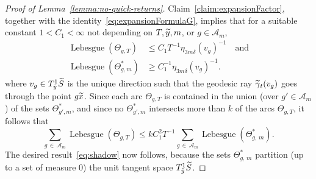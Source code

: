 \documentclass[10pt]{amsart}
\theoremstyle{definition}\newtheorem{defi}[theo]{Definition}\newtheorem{rema}[theo]{Remark}\newtheorem{exam}[theo]{Example}\newtheorem{exem}[theo]{Example}\newtheorem{nota}[theo]{Notation}
\DeclareMathOperator{\Lebesgue}{Lebesgue}
\let\oldtilde\tilde
\renewcommand*{\tilde}[1]{\mathchoice{\widetilde{#1}}{\widetilde{#1}}{\oldtilde{#1}}{\oldtilde{#1}}}\let\oldforall\forall
\renewcommand*{\forall}{\mathrel{\oldforall}}
\begin{document}
\begin{proof}[Proof of Lemma~\ref{lemma:no-quick-returns}]
Claim~\ref{claim:expansionFactor}, together with the identity~\eqref{eq:expansionFormulaG}, implies that for a suitable constant $1<C_{1}<\infty$ not depending on $T,\tilde{y},m$, or $g\in \mathcal{A}_{m}$,
\begin{align*}
\Lebesgue (\Theta_{g,T})&\leq C_{1} T^{-1}\eta_{3m \delta}(v_{g})^{-1} \quad\text{and}\\
\Lebesgue (\Theta^{*}_{g,m})&\geq C_{1}^{-1}\eta_{3m\delta}(v_{g})^{-1}.
\end{align*}
where $v_{g}\in T^{1}_{\tilde{y}}\tilde{S}$ is the unique direction such that the geodesic ray $\tilde{\gamma}_{t}(v_{g})$ goes through the point $g\tilde{x}$. Since each arc $\Theta_{g,T}$ is contained in the union (over $g' \in \mathcal{A}_{m}$) of the sets $\Theta^{*}_{g',m}$, and since no $\Theta^{*}_{g',m}$ intersects more than $k$ of the arcs $\Theta_{g,T}$, it follows that
\[
\sum_{g\,\in\,\mathcal{A}_{m}}\Lebesgue (\Theta_{g,T})\leq kC_{1}^{2} T^{-1} \sum_{g\,\in\,\mathcal{A}_{m}}\Lebesgue (\Theta^{*}_{g,\,m}).
\]
The desired result~\eqref{eq:shadow} now follows, because the sets $\Theta^{*}_{g,\,m}$ partition (up to a set of measure $0$) the unit tangent space $T^{1}_{\tilde{y}}\tilde{S}$.




\end{proof}
\end{document}
